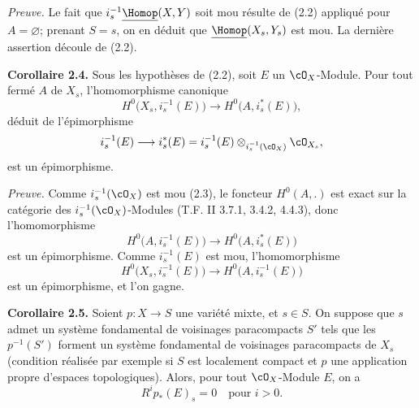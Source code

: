 \emph{Preuve.} Le fait que $i_s^{-1}\underline{\Homop}(X,Y)$ soit mou résulte de (2.2) appliqué pour $A=\varnothing$; prenant $S=s$, on en déduit que $\underline{\Homop}(X_s,Y_s)$ est mou. La dernière assertion découle de (2.2).

\textbf{Corollaire 2.4.} Sous les hypothèses de (2.2), soit $E$ un $\cO_X$-Module. Pour tout fermé $A$ de $X_s$, l'homomorphisme canonique
\[
  H^0\bigl(X_s,i_s^{-1}(E)\bigr)
  \longrightarrow
  H^0\bigl(A,i_s^*(E)\bigr),
\]
déduit de l'épimorphisme
\[
  i_s^{-1}(E)\longrightarrow i_s^*(E)
  =i_s^{-1}(E)\otimes_{i_s^{-1}(\cO_X)}\cO_{X_s},
\]
est un épimorphisme.

\emph{Preuve.} Comme $i_s^{-1}(\cO_X)$ est mou (2.3), le foncteur $H^0(A,.)$ est exact sur la catégorie des $i_s^{-1}(\cO_X)$-Modules (T.F. II 3.7.1, 3.4.2, 4.4.3), donc l'homomorphisme
\[
  H^0\bigl(A,i_s^{-1}(E)\bigr)
  \longrightarrow
  H^0\bigl(A,i_s^*(E)\bigr)
\]
est un épimorphisme. Comme $i_s^{-1}(E)$ est mou, l'homomorphisme
\[
  H^0\bigl(X_s,i_s^{-1}(E)\bigr)
  \longrightarrow
  H^0\bigl(A,i_s^{-1}(E)\bigr)
\]
est un épimorphisme, et l'on gagne.

\textbf{Corollaire 2.5.} Soient $p:X\to S$ une variété mixte, et $s\in S$. On suppose que $s$ admet un système fondamental de voisinages paracompacts $S'$ tels que les $p^{-1}(S')$ forment un système fondamental de voisinages paracompacts de $X_s$ (condition réalisée par exemple si $S$ est localement compact et $p$ une application propre d'espaces topologiques). Alors, pour tout $\cO_X$-Module $E$, on a
\[
  R^i p_*(E)_s=0 \quad \text{pour } i>0.
\]

